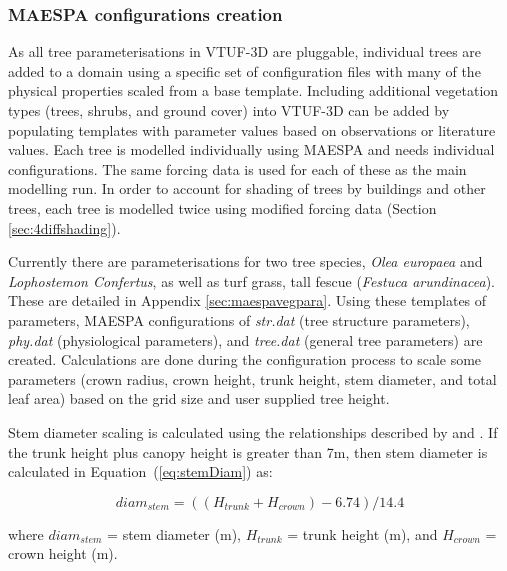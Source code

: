 \documentclass[preprint,12pt,authoryear]{elsarticle}
\begin{document}
\subsubsection{MAESPA configurations creation}\label{section:MaespaTreeConfig}



As all tree parameterisations in VTUF-3D are pluggable, individual trees are added to a domain using a specific set of configuration files with many of the physical properties scaled from a base template.  Including additional vegetation types (trees, shrubs, and ground cover) into VTUF-3D can be added by populating templates with parameter values based on observations or literature values. Each tree is modelled individually using MAESPA and needs individual configurations. The same forcing data is used for each of these as the main modelling run. In order to account for shading of trees by buildings and other trees, each tree is modelled twice using modified forcing data (Section \ref{sec:4diffshading}). 

Currently there are parameterisations for two tree species, \textit{Olea europaea} and \textit{Lophostemon Confertus}, as well as turf grass, tall fescue (\textit{Festuca arundinacea}). These are detailed in Appendix \ref{sec:maespavegpara}. Using these templates of parameters, MAESPA configurations of \textit{str.dat} (tree structure parameters), \textit{phy.dat} (physiological parameters), and \textit{tree.dat} (general tree parameters) are created. Calculations are done during the configuration process to scale some parameters (crown radius, crown height, trunk height, stem diameter, and total leaf area) based on the grid size and user supplied tree height. 


Stem diameter scaling is calculated using the relationships described by \cite{Buba2013} and \cite{Sumida2013}. If the trunk height plus canopy height is greater than 7m, then stem diameter is calculated in Equation~(\ref{eq:stemDiam}) as:


\begin{equation} diam _{stem} = ((H _{trunk} + H _{crown})-6.74)/14.4
\label{eq:stemDiam} 
\end{equation} 

where $diam _{stem}$ = stem diameter (m), $H _{trunk}$ = trunk height (m), and $H _{crown}$ = crown height (m).
\end{document}
